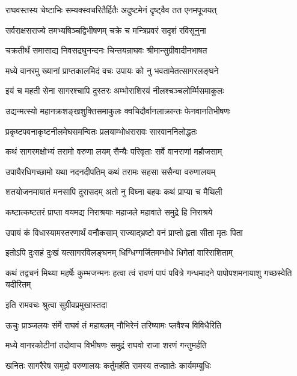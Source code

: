 \twolineshloka
{राघवस्तस्य चेष्टाभिः सम्यक्स्वचरितैर्हितैः}
{अदुष्टमेनं दृष्ट्वैव तत एनमपूजयत्}%

\twolineshloka
{सर्वराक्षसराज्ये तमभ्यषिञ्चद्विभीषणम्}
{चक्रे च मन्त्रिप्रवरं सदृशं रविसूनुना}%

\twolineshloka
{चक्रतीर्थं समासाद्य निवसद्रघुनन्दनः}
{चिन्तयन्राघवः श्रीमान्सुग्रीवादीनभाषत}%

\twolineshloka
{मध्ये वानरमु ख्यानां प्राप्तकालमिदं वचः}
{उपायः को नु भवतामेतत्सागरलङ्घने}%

\twolineshloka
{इयं च महती सेना सागरश्चापि दुस्तरः}
{अम्भोराशिरयं नीलश्चञ्चलोर्म्मिसमाकुलः}%

\twolineshloka
{उद्यन्मत्स्यो महानक्रशङ्खशुक्तिसमाकुलः}
{क्वचिदौर्वानलाक्रान्तः फेनवानतिभीषणः}%

\twolineshloka
{प्रकृष्टपवनाकृष्टनीलमेघसमन्वितः}
{प्रलयाम्भोधरारावः सारवाननिलोद्धतः}%

\twolineshloka
{कथं सागरमक्षोभ्यं तरामो वरुणा लयम्}
{सैन्यैः परिवृताः सर्वे वानराणां महौजसाम्}%

\twolineshloka
{उपायैरधिगच्छामो यथा नदनदीपतिम्}
{कथं तरामः सहसा ससैन्या वरुणालयम्}%

\twolineshloka
{शतयोजनमायातं मनसापि दुरासदम्}
{अतो नु विघ्ना बहवः कथं प्राप्या च मैथिली}%

\twolineshloka
{कष्टात्कष्टतरं प्राप्ता वयमद्य निराश्रयाः}
{महाजले महावाते समुद्रे हि निराश्रये}%

\twolineshloka
{उपायं कं विधास्यामस्तरणार्थं वनौकसाम्}
{राज्याद्भ्रष्टो वनं प्राप्तो हृता सीता मृतः पिता}%

\twolineshloka
{इतोऽपि दुःसहं दुःखं यत्सागरविलङ्घनम्}
{धिग्धिग्गर्जितमम्भोधे धिगेतां वारिराशिताम्}%

\threelineshloka
{कथं तद्वचनं मिथ्या महर्षेः कुम्भजन्मनः}
{हत्वा त्वं रावणं पापं पवित्रे गन्धमादने}
{पापोपशमनायाशु गच्छस्वेति यदीरितम्}%


\onelineshloka
{इति रामवचः श्रुत्वा सुग्रीवप्रमुखास्तदा}%

\twolineshloka
{ऊचुः प्राञ्जलयः संर्मे राघवं तं महाबलम्}
{नौभिरेनं तरिष्यामः प्लवैश्च विविधैरिति}%

\twolineshloka
{मध्ये वानरकोटीनां तदोवाच विभीषणः}
{समुद्रं राघवो राजा शरणं गन्तुमर्हति}%

\twolineshloka
{खनितः सागरैरेष समुद्रो वरुणालयः}
{कर्तुमर्हति रामस्य तज्ज्ञातेः कार्यमम्बुधिः}%

